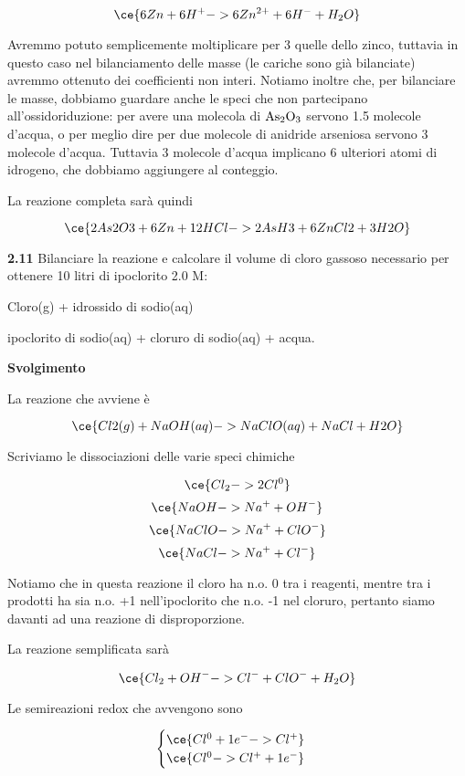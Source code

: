 $$\ce{6Zn + 6H^+ -> 6Zn^{2+} + 6H^- + H_2O}$$

Avremmo potuto semplicemente moltiplicare per 3 quelle dello zinco, tuttavia in questo caso nel bilanciamento delle masse (le cariche sono già bilanciate) avremmo ottenuto dei coefficienti non interi. Notiamo inoltre che, per bilanciare le masse, dobbiamo guardare anche le speci che non partecipano all'ossidoriduzione: per avere una molecola di $\rm As_2O_3$ servono 1.5 molecole d'acqua, o per meglio dire per due molecole di anidride arseniosa servono 3 molecole d'acqua. Tuttavia 3 molecole d'acqua implicano 6 ulteriori atomi di idrogeno, che dobbiamo aggiungere al conteggio.

La reazione completa sarà quindi 

$$\ce{2As2O3 + 6Zn + 12HCl -> 2AsH3 + 6ZnCl2 + 3H2O}$$

\vspace{0.2cm}\textbf{2.11} Bilanciare la reazione e calcolare il volume di cloro gassoso necessario per ottenere 10 litri di ipoclorito 2.0 M:

\begin{center}
    Cloro(g) + idrossido di sodio(aq) \ce{->} 
    
    \ce{->} ipoclorito di sodio(aq) + cloruro di sodio(aq) + acqua. 
\end{center}

\vspace{0.2cm}\large\textbf{Svolgimento}\normalsize

\vspace{0.2cm}La reazione che avviene è

$$\ce{Cl2(g) + NaOH(aq) ->  NaClO(aq) + NaCl + H2O}$$

Scriviamo le dissociazioni delle varie speci chimiche

$$\ce{Cl_2 -> 2Cl^0 }$$
$$\ce{NaOH -> Na^+ + OH^-}$$
$$\ce{NaClO -> Na^+ + ClO^-}$$
$$\ce{NaCl -> Na^+ + Cl^-}$$

Notiamo che in questa reazione il cloro ha n.o. 0 tra i reagenti, mentre tra i prodotti ha sia n.o. +1 nell'ipoclorito che n.o. -1 nel cloruro, pertanto siamo davanti ad una reazione di disproporzione.

La reazione semplificata sarà

$$\ce{Cl_2 + OH^- -> Cl^- + ClO^- + H_2O}$$

Le semireazioni redox che avvengono sono

$$\begin{cases}
    \ce{Cl^{0} + 1e^- -> Cl^+}\\
    \ce{Cl^{0} -> Cl^+ + 1e^-}
\end{cases}$$

